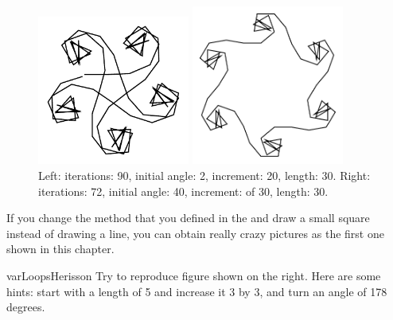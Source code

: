 \begin{figure}[!htbp]
\begin{minipage}[c]{.5\linewidth}
\centerline{\includegraphics[width=5cm]{varLoopsfixedLengthSpiral23}}
\end{minipage}
\begin{minipage}[c]{.5\linewidth}
\centerline{\includegraphics[width=5cm]{varLoopsfixedLengthSpiral72}}
\end{minipage}
\caption{Left: iterations: 90, initial angle: 2, increment: 20, length: 30. 
Right: iterations: 72, initial angle: 40, increment: of 30, length: 30.}
\label{fig:crazy}
\end{figure}


\begin{exonofig}%
If you change the method that you defined in the  and draw 
a small square instead of drawing a line, you can obtain really crazy pictures as the first one shown in this chapter.\end{exonofig}

\begin{exofig}{varLoopsHerisson}
Try to reproduce figure shown on the right. Here are some hints: start with a length of 5 and increase it 3 by 3, and turn an angle of 178 degrees.
\end{exofig}








\ifx\wholebook\relax\else
\fi

